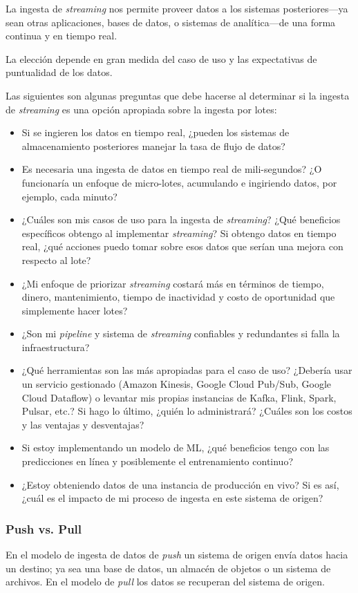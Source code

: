 \documentclass[12pt]{book}
\begin{document}
La ingesta de \textit{streaming} nos permite proveer datos a los sistemas posteriores—ya sean otras aplicaciones, bases de datos, o sistemas de analítica—de una forma continua y en tiempo real.

La elección depende en gran medida del caso de uso y las expectativas de puntualidad de los datos.

Las siguientes son algunas preguntas que debe hacerse al determinar si la ingesta de \textit{streaming} es una opción apropiada sobre la ingesta por lotes:
\begin{itemize}
    \item Si se ingieren los datos en tiempo real, ¿pueden los sistemas de almacenamiento posteriores manejar la tasa de flujo de datos?
    \item Es necesaria una ingesta de datos en tiempo real de mili-segundos? ¿O funcionaría un enfoque de micro-lotes, acumulando e ingiriendo datos, por ejemplo, cada minuto?
    \item ¿Cuáles son mis casos de uso para la ingesta de \textit{streaming}? ¿Qué beneficios específicos obtengo al implementar \textit{streaming}? Si obtengo datos en tiempo real, ¿qué acciones puedo tomar sobre esos datos que serían una mejora con respecto al lote?
    \item ¿Mi enfoque de priorizar \textit{streaming} costará más en términos de tiempo, dinero, mantenimiento, tiempo de inactividad y costo de oportunidad que simplemente hacer lotes?
    \item ¿Son mi \textit{pipeline} y sistema de \textit{streaming} confiables y redundantes si falla la infraestructura?
    \item ¿Qué herramientas son las más apropiadas para el caso de uso? ¿Debería usar un servicio gestionado (Amazon Kinesis, Google Cloud Pub/Sub, Google Cloud Dataflow) o levantar mis propias instancias de Kafka, Flink, Spark, Pulsar, etc.? Si hago lo último, ¿quién lo administrará? ¿Cuáles son los costos y las ventajas y desventajas?
    \item Si estoy implementando un modelo de ML, ¿qué beneficios tengo con las predicciones en línea y posiblemente el entrenamiento continuo?
    \item ¿Estoy obteniendo datos de una instancia de producción en vivo? Si es así, ¿cuál es el impacto de mi proceso de ingesta en este sistema de origen?
\end{itemize}

\subsubsection{Push vs. Pull}
En el modelo de ingesta de datos de \textit{push} un sistema de origen envía datos hacia un destino; ya sea una base de datos, un almacén de objetos o un sistema de archivos.
En el modelo de \textit{pull} los datos se recuperan del sistema de origen.
\end{document}

